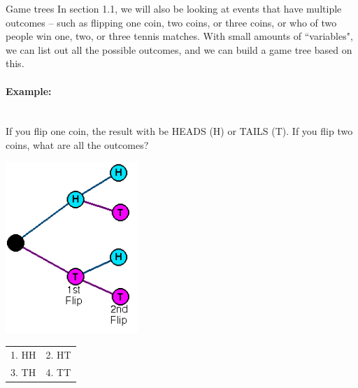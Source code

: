 \documentclass[a4paper,12pt]{book}
\begin{document}
        \begin{intro}{Game trees}
            In section 1.1, we will also be looking at events that have multiple outcomes –
            such as flipping one coin, two coins, or three coins, or who of two people win
            one, two, or three tennis matches. With small amounts of ``variables", we can
            list out all the possible outcomes, and we can build a game tree based on this.
            
            \paragraph{Example:} ~\\
            If you flip one coin, the result with be HEADS (H) or TAILS (T).
            If you flip two coins, what are all the outcomes?

            \begin{center}
                \includegraphics[width=5cm]{images/gametree.png}
                
                \begin{tabular}{l l}
                    1. HH &  2. HT \\
                    3. TH &  4. TT
                \end{tabular}
            \end{center}

        \end{intro}
\end{document}
